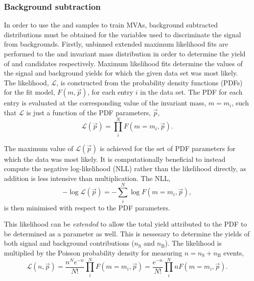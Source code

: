 

\subsubsection{Background subtraction}
\label{sec:MVAbackgroundsubtraction}
In order to use the \decay{\Bs}{\jpsi\phiz} and \decay{\Bsb}{\Dsp\pim} samples to train MVAs, background subtracted distributions must be obtained for the variables used to discriminate the signal from backgrounds.  Firstly, unbinned extended maximum likelihood fits are performed to the \Dsp and \phiz invariant mass distribution in order to determine the yield of \Dsp and \phiz candidates respectively. 
Maximum likelihood fits determine the values of the signal and background yields for which the given data set was most likely. The likelihood, $\mathcal{L}$, is constructed from the probability density functions (PDFs) for the fit model, $F(m,\vec{p})$, for each entry $i$ in the data set. The PDF for each entry is evaluated at the corresponding value of the invariant mass, $m = m_{i}$, such that $\mathcal{L}$ is just a function of the PDF parameters, $\vec{p}$,
\begin{equation}
\mathcal{L}(\vec{p}) = \prod_{i}^{N} F(m=m_{i},\vec{p}).
\end{equation}

The maximum value of $\mathcal{L}(\vec{p})$ is achieved for the set of PDF parameters for which the data was most likely. 
It is computationally beneficial to instead compute the negative log-likelihood (NLL) rather than the likelihood directly, as addition is less intensive than multiplication. The NLL,
\begin{equation}
-\log\mathcal{L}(\vec{p}) = -\sum_{i}^{N} \log F(m=m_{i},\vec{p}),
\end{equation}
is then minimised with respect to the PDF parameters.

This likelihood can be \emph{extended} to allow the total yield attributed to the PDF to be determined as a parameter as well. This is nessesary to determine the yields of both signal and background contributions ($n_{\text{S}}$ and $n_{\text{B}}$).
The likelihood is multiplied by the Poisson probability density for measuring $n = n_{\text{S}} + n_{\text{B}}$ events, 
\begin{equation}
\mathcal{L}(n,\vec{p}) = \frac{n^{N}e^{-n}}{N!}\prod_{i}^{N} F(m=m_{i},\vec{p}) = \frac{e^{-n}}{N!}\prod_{i}^{N} n F(m=m_{i},\vec{p}).
\end{equation}

